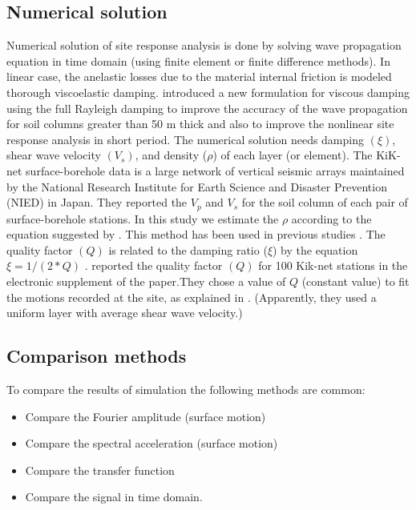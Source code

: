 \subsection{Numerical solution}

Numerical solution of site response analysis is done by solving wave propagation equation in time domain (using finite element or finite difference methods). In linear case, the anelastic losses due to the material internal friction is modeled thorough viscoelastic damping. \citet{Hashash2002} introduced a new formulation for viscous damping using the full Rayleigh damping to improve the accuracy of the wave propagation for soil columns greater than 50 m thick and also to improve the nonlinear site response analysis in short period. The numerical solution needs damping $(\xi)$, shear wave velocity $(V_s)$, and density ($\rho$) of each layer (or element). The KiK-net surface-borehole data is a large network of vertical seismic arrays maintained by the National Research Institute for Earth Science and Disaster Prevention (NIED) in Japan. They reported the $V_p$ and $V_s$ for the soil column of each pair of surface-borehole stations. In this study we estimate the $\rho$ according to the equation suggested by \citet{Boore2007}. This method has been used in previous studies \citep[e.g.][]{Kaklamanos2013, Thompson2012}.  The quality factor $(Q)$ is related to the damping ratio ($\xi$) by the equation $\xi = 1/(2*Q)$ \citep{Kramer1996}. \citet{Kaklamanos2013} reported the quality factor $(Q)$ for 100 Kik-net stations in the electronic supplement of the paper.They chose a value of $Q$ (constant value) to fit the motions recorded at the site, as explained in \citet{Thompson2012}. ({\color{red}Apparently, they used a uniform layer with average shear wave velocity.})


\subsection{Comparison methods}

To compare the results of simulation the following methods are common:

\begin{itemize}
  \item Compare the Fourier amplitude (surface motion)
  \item Compare the spectral acceleration (surface motion)
  \item Compare the transfer function 
  \item Compare the signal in time domain.
\end{itemize}

